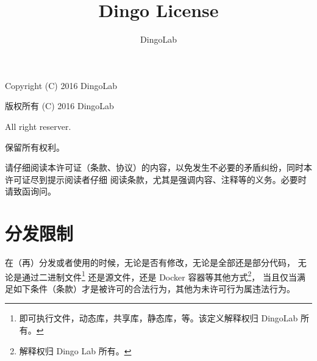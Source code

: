 








\makeatletter
\def\@NoStyleChaper{\ralex} %
\def\@LicenseDoc{\ralex} %
\def\@UsingAppendix{\ralex} %
\def\@DocType{article}
\def\@DocTypeCTEX{ctexart}
\makeatother


\doclass

\title{\Huge Dingo License}
\author{DingoLab}


  \maketitle

  {\huge Copyright (C) 2016 DingoLab}
  \par
  {\huge 版权所有 (C) 2016 DingoLab}
  \vspace*{3em}
  \par
  {\huge All right reserver.}
  \par
  {\huge 保留所有权利。}
  \par
  \vspace*{3em}
  {\huge 请仔细阅读本许可证（条款、协议）的内容，以免发生不必要的矛盾纠纷，同时本许可证尽到提示阅读者仔细
  阅读条款，尤其是强调内容、注释等的义务。必要时请致函询问。}
  \newpage

  \section{分发限制}
  在（再）分发或者使用的时候，无论是否有修改，无论是全部还是部分代码，
  无论是通过二进制文件\footnote{即可执行文件，动态库，共享库，静态库，等。该定义解释权归 DingoLab 所有。}
  还是源文件，还是 Docker 容器等其他方式\footnote{解释权归 Dingo Lab 所有。}，
  当且仅当满足如下条件（条款）才是被许可的合法行为，其他为未许可行为属违法行为。

